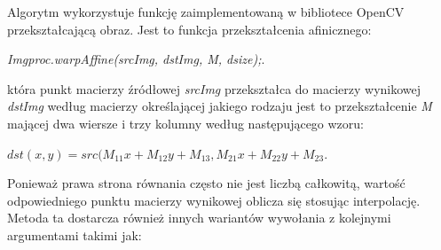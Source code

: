 \documentclass[a4paper,12pt]{article}
\begin{document}
		        Algorytm wykorzystuje funkcję zaimplementowaną w bibliotece OpenCV przekształcającą obraz. Jest to funkcja przekształcenia afinicznego:
    		    \begin{center}
    		        \textit{Imgproc.warpAffine(srcImg, dstImg, M, dsize);}.
    		    \end{center}
		        która punkt macierzy źródłowej \textit{srcImg} przekształca do macierzy wynikowej \textit{dstImg} według macierzy określającej jakiego rodzaju jest to przekształcenie \textit{M} mającej dwa wiersze i trzy kolumny według następującego wzoru:
                \begin{center}
                    \textit{$dst(x,y) = src( M_{11} x + M_{12} y + M_{13}, M_{21} x + M_{22} y + M_{23}$}.
                \end{center} 
                Ponieważ prawa strona równania często nie jest liczbą całkowitą, wartość odpowiedniego punktu macierzy wynikowej oblicza się stosując interpolację. Metoda ta dostarcza również innych wariantów wywołania z kolejnymi argumentami takimi jak: 
                \newpage
\end{document}
